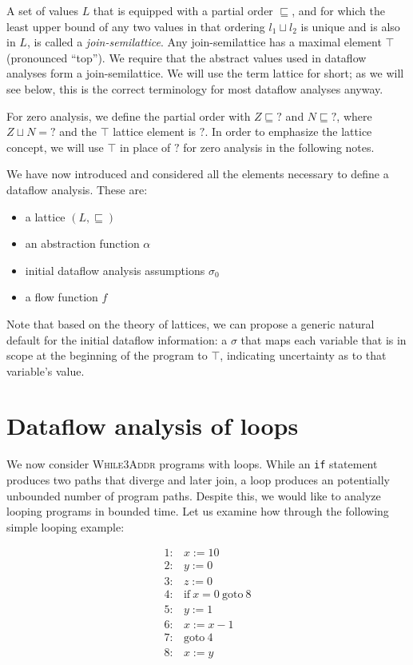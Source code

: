 \documentclass[11pt]{article}
\newcommand{\join}{\sqcup}
\newcommand{\alap}{\sqsubseteq}
\begin{document}
A set of values $L$ that is equipped with a partial order $\alap$, and for which
the least upper bound of any two values in that ordering $l_1 \join l_2$ is
unique and is also in $L$, is called a \textit{join-semilattice}.  Any
join-semilattice has a maximal element $\top$ (pronounced ``top'').  We require
that the abstract values used in dataflow analyses form a join-semilattice.  We
will use the term lattice for short; as we will see below, this is the correct
terminology for most dataflow analyses anyway.

For zero analysis, we define the partial order with $Z \alap {?}$ and $N \alap
{?}$, where $Z \join N = {?}$ and the $\top$ lattice element is $?$.  In order
to emphasize the lattice concept, we will use $\top$ in place of $?$ for zero
analysis in the following notes.

We have now introduced and considered all the elements necessary to define a
dataflow analysis.  These are:

\begin{itemize}[labelwidth=0.7em, labelsep=0.6em, topsep=0ex, itemsep=0ex,
  parsep=0ex] 
\item a lattice $(L,\alap)$
\item an abstraction function $\alpha$
\item initial dataflow analysis assumptions $\sigma_0$
\item a flow function $f$
\end{itemize}

Note that based on the theory of lattices, we can propose a generic natural
default for the initial dataflow information: a $\sigma$ that maps each variable
that is in scope at the beginning of the program to $\top$, indicating
uncertainty as to that variable's value.

\section{Dataflow analysis of loops}

We now consider \textsc{While3Addr} programs with loops.  While an \texttt{if}
statement produces two paths that diverge and later join, a loop produces an
potentially unbounded number of program paths.  Despite this, we would like to
analyze looping programs in bounded time.  Let us examine how through the
following simple looping example:

\[
\begin{array}{ll}
1: & x := 10\\
2: & y := 0\\
3: & z := 0\\
4: & \mbox{if}~x=0~\mbox{goto}~8\\
5: & y := 1\\
6: & x := x - 1\\
7: & \mbox{goto}~4\\
8: & x := y\\
\end{array}
\]
\end{document}
